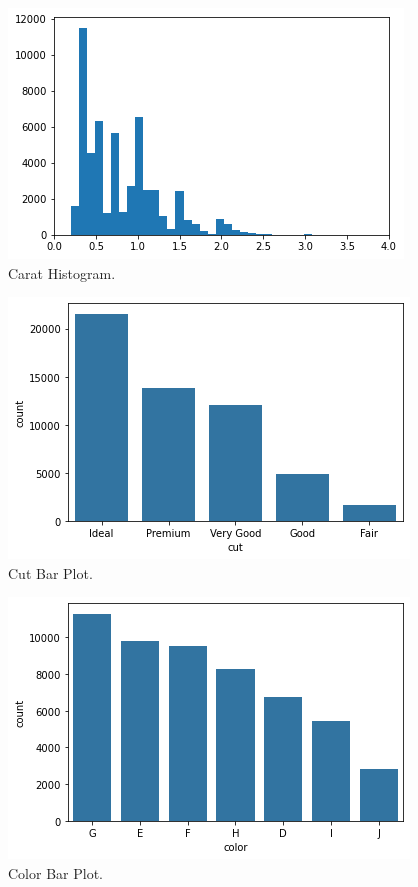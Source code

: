 \begin{figure}
	\includegraphics{images/figure47.png}
	\caption{Carat Histogram.}\label{fig:figure47}
\end{figure}

\begin{figure}
	\includegraphics{images/figure48.png}
	\caption{Cut Bar Plot.}\label{fig:figure48}
\end{figure}

\begin{figure}
	\includegraphics{images/figure49.png}
	\caption{Color Bar Plot.}\label{fig:figure49}
\end{figure}

